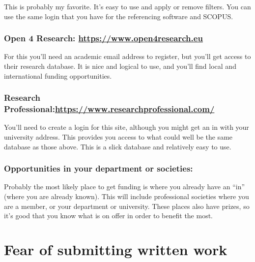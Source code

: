 \documentclass[
]{krantz}
\begin{document}
This is probably my favorite. It's easy to use and apply or remove filters. You can use the same login that you have for the referencing software and SCOPUS.

\hypertarget{open-4-research-httpswww.open4research.eu}{%
\subsubsection{\texorpdfstring{Open 4 Research: \url{https://www.open4research.eu}}{Open 4 Research: https://www.open4research.eu}}\label{open-4-research-httpswww.open4research.eu}}

For this you'll need an academic email address to register, but you'll get access to their research database. It is nice and logical to use, and you'll find local and international funding opportunities.

\hypertarget{research-professionalhttpswww.researchprofessional.com}{%
\subsubsection{\texorpdfstring{Research Professional:\url{https://www.researchprofessional.com/}}{Research Professional:https://www.researchprofessional.com/}}\label{research-professionalhttpswww.researchprofessional.com}}

You'll need to create a login for this site, although you might get an in with your university address. This provides you access to what could well be the same database as those above. This is a slick database and relatively easy to use.

\hypertarget{opportunities-in-your-department-or-societies}{%
\subsubsection{Opportunities in your department or societies:}\label{opportunities-in-your-department-or-societies}}

Probably the most likely place to get funding is where you already have an ``in'' (where you are already known). This will include professional societies where you are a member, or your department or university. These places also have prizes, so it's good that you know what is on offer in order to benefit the most.

\hypertarget{fear}{%
\section{Fear of submitting written work}\label{fear}}
\end{document}
